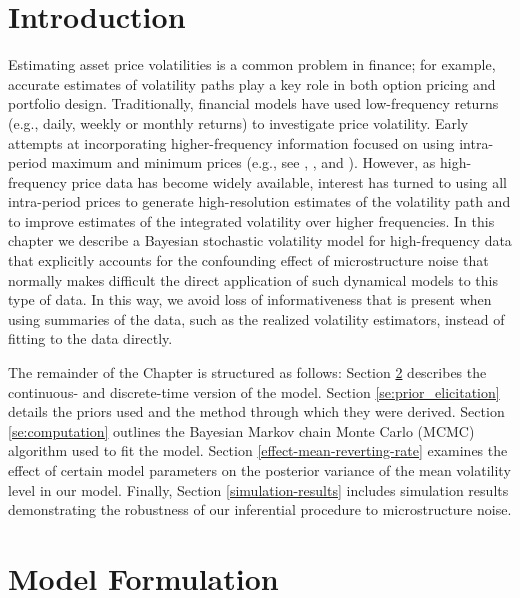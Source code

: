 \label{ch:sv-high-freq}

\section{Introduction}\label{se:introduction}

Estimating asset price volatilities is a common problem in finance; for example, accurate estimates of volatility paths play a key role in both option pricing and portfolio design.  Traditionally, financial models have used low-frequency returns (e.g., daily, weekly or monthly returns) to investigate price volatility.  Early attempts at incorporating higher-frequency information focused on using intra-period maximum and minimum prices (e.g., see \cite{alizadeh2002range}, \cite{brandt2003no-arb}, and \cite{chou2010range}).  However, as high-frequency price data has become widely available, interest has turned to using all intra-period prices to generate high-resolution estimates of the volatility path and to improve estimates of the integrated volatility over higher frequencies. In this chapter we describe a Bayesian stochastic volatility model for high-frequency data that explicitly accounts for the confounding effect of microstructure noise that normally makes difficult the direct application of such dynamical models to this type of data. In this way, we avoid loss of informativeness that is present when using summaries of the data, such as the realized volatility estimators, instead of fitting to the data directly.

The remainder of the Chapter is structured as follows:  Section \ref{se:model_formulation} describes the continuous- and discrete-time version of the model. Section \ref{se:prior_elicitation} details the priors used and the method through which they were derived. Section \ref{se:computation} outlines the Bayesian Markov chain Monte Carlo (MCMC) algorithm used to fit the model. Section \ref{effect-mean-reverting-rate} examines the effect of certain model parameters on the posterior variance of the mean volatility level in our model. Finally, Section \ref{simulation-results} includes simulation results demonstrating the robustness of our inferential procedure to microstructure noise.

\section{Model Formulation}\label{se:model_formulation}

